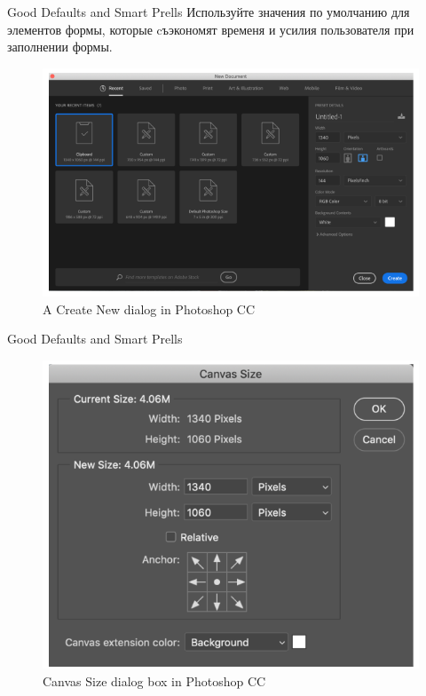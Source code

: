 \documentclass{beamer}
\begin{document}
\begin{frame}[t]{Good Defaults and Smart Prells}
	Используйте значения по умолчанию для элементов формы, которые cъэкономят временя и усилия пользователя при заполнении формы.
	\begin{figure}[h]
		\centering
		\includegraphics[scale=0.5]{images/lec08-pic61.png}
		\caption{A Create New dialog in Photoshop CC}
	\end{figure}
\end{frame}

\begin{frame}[t]{Good Defaults and Smart Prells}
	\begin{figure}[h]
		\centering
		\includegraphics[scale=0.4]{images/lec08-pic62.png}
		\caption{Canvas Size dialog box in Photoshop CC}
	\end{figure}
\end{frame}
\end{document}
